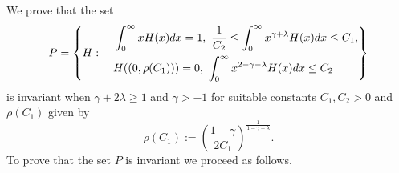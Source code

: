 \documentclass[11pt]{article}
\numberwithin{equation}{section}
\theoremstyle{plain}
\newcommand{\der}{\textup{d}}
\begin{document}
We prove that the set
\begin{equation*}
P=\left\{ H : \quad \begin{aligned}& \int_0^\infty x H(x) \der x =1,\ \frac{1}{C_{2}} \leq  \int_0^\infty x^{\gamma + \lambda} H (x) \der x \leq C_1, \\
&H((0, \rho(C_1) ))=0, \ \int_0^\infty x^{2-\gamma - \lambda} H (x) \der x \leq C_{2}
\end{aligned} 
\right\} 
\end{equation*} 
is invariant when $\gamma + 2 \lambda \geq 1 $ and $\gamma > -1$ for suitable constants  $C_1, C_2>0 $ and $\rho(C_1)$ given by 
\begin{equation}\label{delta1formula}
\rho(C_1):= \left(\frac{1-\gamma }{2 C_1} \right)^{\frac{1}{1-\gamma -\lambda}}.
\end{equation} 
To prove that the set $P$ is invariant we proceed as follows.
\end{document}
